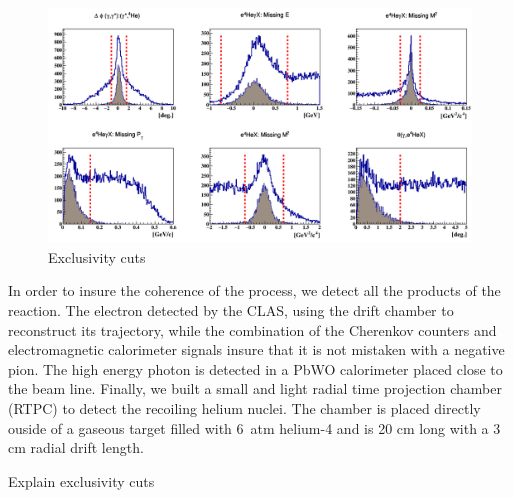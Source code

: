 \documentclass[%
 reprint,
 amsmath,amssymb,
 aps,
]{revtex4-1}
\begin{document}
\begin{figure}[tbp]
\caption{\label{fig:exclu} Exclusivity cuts}
\includegraphics[width=17.2cm]{all_coh_exc_cuts.png}
\end{figure}

In order to insure the coherence of the process, we detect all the products
of the reaction. The electron detected by the CLAS, using the drift chamber 
to reconstruct its trajectory, while the combination of the Cherenkov counters
and electromagnetic calorimeter signals insure that it is not mistaken with
a negative pion. The high energy photon is detected in a PbWO calorimeter 
placed close to the beam line. Finally, we built a small and light 
radial time projection chamber (RTPC) to 
detect the recoiling helium nuclei. The chamber is placed directly ouside of 
a gaseous target filled with 6~atm helium-4 and is 20 cm long with a 3 cm radial
drift length. 


Explain exclusivity cuts
\end{document}
